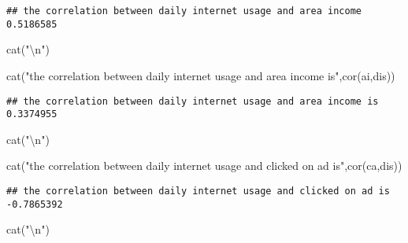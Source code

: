 \documentclass[
]{article}
\newenvironment{Shaded}{\begin{snugshade}}{\end{snugshade}}
\newcommand{\FunctionTok}[1]{\textcolor[rgb]{0.00,0.00,0.00}{#1}}
\newcommand{\NormalTok}[1]{#1}
\newcommand{\SpecialCharTok}[1]{\textcolor[rgb]{0.00,0.00,0.00}{#1}}
\newcommand{\StringTok}[1]{\textcolor[rgb]{0.31,0.60,0.02}{#1}}
\begin{document}
\begin{verbatim}
## the correlation between daily internet usage and area income 0.5186585
\end{verbatim}

\begin{Shaded}
\begin{Highlighting}[]
\FunctionTok{cat}\NormalTok{(}\StringTok{"}\SpecialCharTok{\textbackslash{}n}\StringTok{"}\NormalTok{)}
\end{Highlighting}
\end{Shaded}

\begin{Shaded}
\begin{Highlighting}[]
\FunctionTok{cat}\NormalTok{(}\StringTok{"the correlation between daily internet usage and area income is"}\NormalTok{,}\FunctionTok{cor}\NormalTok{(ai,dis))}
\end{Highlighting}
\end{Shaded}

\begin{verbatim}
## the correlation between daily internet usage and area income is 0.3374955
\end{verbatim}

\begin{Shaded}
\begin{Highlighting}[]
\FunctionTok{cat}\NormalTok{(}\StringTok{"}\SpecialCharTok{\textbackslash{}n}\StringTok{"}\NormalTok{)}
\end{Highlighting}
\end{Shaded}

\begin{Shaded}
\begin{Highlighting}[]
\FunctionTok{cat}\NormalTok{(}\StringTok{"the correlation between daily internet usage and clicked on ad is"}\NormalTok{,}\FunctionTok{cor}\NormalTok{(ca,dis))}
\end{Highlighting}
\end{Shaded}

\begin{verbatim}
## the correlation between daily internet usage and clicked on ad is -0.7865392
\end{verbatim}

\begin{Shaded}
\begin{Highlighting}[]
\FunctionTok{cat}\NormalTok{(}\StringTok{"}\SpecialCharTok{\textbackslash{}n}\StringTok{"}\NormalTok{)}
\end{Highlighting}
\end{Shaded}
\end{document}
